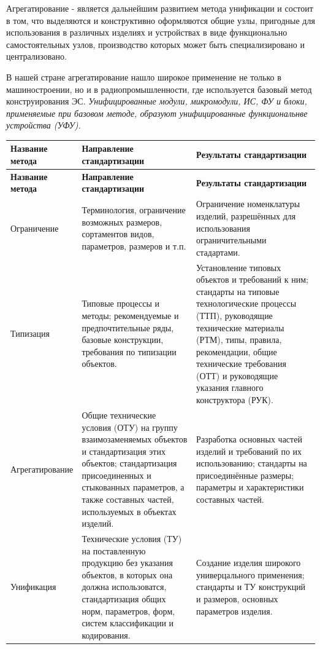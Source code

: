 \documentclass[unicode, 12pt, a4paper, oneside]{article}
\begin{document}
Агрегатирование  - является дальнейшим развитием метода унификации и состоит в том, что выделяются и конструктивно оформляются общие узлы, пригодные для использования в различных изделиях и устройствах в виде функционально самостоятельных узлов, производство которых может быть специализировано и централизовано.

В нашей стране агрегатирование нашло широкое применение не только в машиностроении, но и в радиопромышленности, где используется базовый метод конструирования ЭС. \textit{Унифицированные модули, микромодули, ИС, ФУ и блоки, применяемые при базовом методе, образуют унифицированные функциональнве устройства (УФУ).}

\begin{longtable}{|L{0.33}|L{0.33}|L{0.33}|}
\hline
\textbf{Название  метода}	& \textbf{Направление стандартизации}	& \textbf{Результаты стандартизации}	\\ \hline
\endfirsthead
\hline
\textbf{Название  метода}	& \textbf{Направление стандартизации}	& \textbf{Результаты стандартизации}	\\ \hline
\endhead

Ограничение &
Терминология, ограничение возможных размеров, сортаментов видов, параметров, размеров и т.п. &
Ограничение номенклатуры изделий, разрешённых для использования  ограничительными стадартами. \\ \hline

Типизация &
Типовые процессы и методы; рекомендуемые и предпочтительные ряды, базовые конструкции, требования по типизации объектов. &
Установление типовых объектов и требований к ним; стандарты на типовые технологические процессы (ТТП), руководящие технические материалы (РТМ), типы, правила, рекомендации, общие технические требования (ОТТ) и руководящие указания главного конструктора (РУК). \\ \hline

Агрегатирование &
Общие технические условия (ОТУ) на группу взаимозаменяемых объектов и стандартизация этих объектов; стандартизация присоединенных и стыкованных параметров, а также составных частей, используемых в объектах изделий. &
Разработка основных частей изделий и требований по их использованию; стандарты на присоединённые размеры; параметры и характеристики составных частей. \\ \hline

Унификация &
Технические условия (ТУ) на поставленную продукцию без указания объектов, в которых она должна использоватся, стандартизация общих норм, параметров, форм, систем классификации и кодирования. &
Создание изделия широкого универцального применения; стандарты и ТУ конструкций и размеров, основных параметров изделия. \\ \hline

\end{longtable}\addtocounter{table}{-1}
\end{document}
